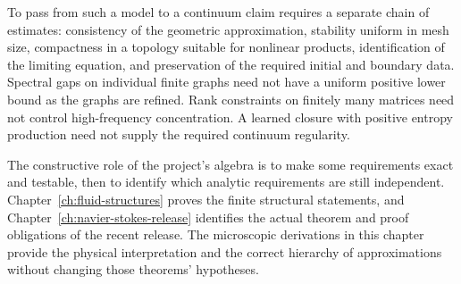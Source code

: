 To pass from such a model to a continuum claim requires a separate
chain of estimates: consistency of the geometric approximation,
stability uniform in mesh size, compactness in a topology suitable
for nonlinear products, identification of the limiting equation,
and preservation of the required initial and boundary data.
Spectral gaps on individual finite graphs need not have a uniform
positive lower bound as the graphs are refined.  Rank constraints
on finitely many matrices need not control high-frequency
concentration.  A learned closure with positive entropy production
need not supply the required continuum regularity.

The constructive role of the project's algebra is to make some
requirements exact and testable, then to identify which analytic
requirements are still independent.  Chapter~\ref{ch:fluid-structures}
proves the finite structural statements, and
Chapter~\ref{ch:navier-stokes-release} identifies the actual theorem
and proof obligations of the recent release.  The microscopic
derivations in this chapter provide the physical interpretation and
the correct hierarchy of approximations without changing those
theorems' hypotheses.
